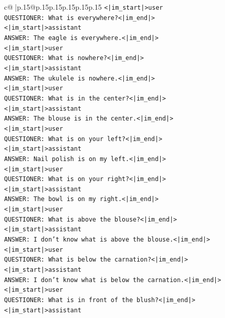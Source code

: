 \documentclass{article}
\begin{document}
{\begin{supertabular}{c@{$\;$}|p{.15\linewidth}@{}p{.15\linewidth}p{.15\linewidth}p{.15\linewidth}p{.15\linewidth}p{.15\linewidth}}
{{{\texttt{<|im\_start|>user} \\
\texttt{QUESTIONER: What is everywhere?<|im\_end|>} \\
\texttt{<|im\_start|>assistant} \\
\texttt{ANSWER: The eagle is everywhere.<|im\_end|>} \\
\texttt{<|im\_start|>user} \\
\texttt{QUESTIONER: What is nowhere?<|im\_end|>} \\
\texttt{<|im\_start|>assistant} \\
\texttt{ANSWER: The ukulele is nowhere.<|im\_end|>} \\
\texttt{<|im\_start|>user} \\
\texttt{QUESTIONER: What is in the center?<|im\_end|>} \\
\texttt{<|im\_start|>assistant} \\
\texttt{ANSWER: The blouse is in the center.<|im\_end|>} \\
\texttt{<|im\_start|>user} \\
\texttt{QUESTIONER: What is on your left?<|im\_end|>} \\
\texttt{<|im\_start|>assistant} \\
\texttt{ANSWER: Nail polish is on my left.<|im\_end|>} \\
\texttt{<|im\_start|>user} \\
\texttt{QUESTIONER: What is on your right?<|im\_end|>} \\
\texttt{<|im\_start|>assistant} \\
\texttt{ANSWER: The bowl is on my right.<|im\_end|>} \\
\texttt{<|im\_start|>user} \\
\texttt{QUESTIONER: What is above the blouse?<|im\_end|>} \\
\texttt{<|im\_start|>assistant} \\
\texttt{ANSWER: I don't know what is above the blouse.<|im\_end|>} \\
\texttt{<|im\_start|>user} \\
\texttt{QUESTIONER: What is below the carnation?<|im\_end|>} \\
\texttt{<|im\_start|>assistant} \\
\texttt{ANSWER: I don't know what is below the carnation.<|im\_end|>} \\
\texttt{<|im\_start|>user} \\
\texttt{QUESTIONER: What is in front of the blush?<|im\_end|>} \\
\texttt{<|im\_start|>assistant} \\
}}}
\end{supertabular}}
\end{document}
